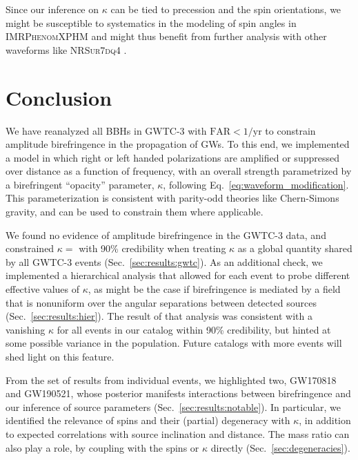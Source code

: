 \documentclass[aps,prd,twocolumn,superscriptaddress,preprintnumbers,floatfix,nofootinbib]{revtex4-2}
\begin{document}
Since our inference on $\kappa$ can be tied to precession and the spin orientations, we might be susceptible to systematics in the modeling of spin angles in \textsc{IMRPhenomXPHM} and might thus benefit from further analysis with other waveforms like \textsc{NRSur7dq4} \cite{Varma:2018mmi}.

\section{Conclusion}
\label{sec:conclusion}

We have reanalyzed all \acp{BBH} in GWTC-3 with $\mathrm{FAR} < 1/\mathrm{yr}$ to constrain amplitude birefringence in the propagation of \acp{GW}.
To this end, we implemented a model in which right or left handed polarizations are amplified or suppressed over distance as a function of frequency, with an overall strength parametrized by a birefringent ``opacity'' parameter, $\kappa$, following Eq.~\eqref{eq:waveform_modification}.
This parameterization is consistent with parity-odd theories like Chern-Simons gravity, and can be used to constrain them where applicable.

We found no evidence of amplitude birefringence in the GWTC-3 data, and constrained $\kappa =$ with 90\% credibility when treating $\kappa$ as a global quantity shared by all GWTC-3 events (Sec.~\ref{sec:results:gwtc}).
As an additional check, we implemented a hierarchical analysis that allowed for each event to probe different effective values of $\kappa$, as might be the case if birefringence is mediated by a field that is nonuniform over the angular separations between detected sources (Sec.~\ref{sec:results:hier}).
The result of that analysis was consistent with a vanishing $\kappa$ for all events in our catalog within 90\% credibility, but hinted at some possible variance in the population.
Future catalogs with more events will shed light on this feature.

From the set of results from individual events, we highlighted two, GW170818 and GW190521, whose posterior manifests interactions between birefringence and our inference of source parameters (Sec.~\ref{sec:results:notable}).
In particular, we identified the relevance of spins and their (partial) degeneracy with $\kappa$, in addition to expected correlations with source inclination and distance.
The mass ratio can also play a role, by coupling with the spins or $\kappa$ directly (Sec.~\ref{sec:degeneracies}).
\end{document}
